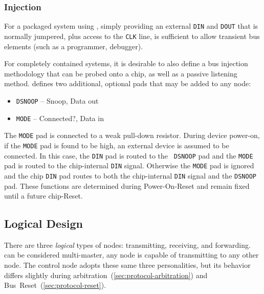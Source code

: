 \subsubsection{Injection}
For a packaged system using \bus, simply providing an external {\tt DIN} and
{\tt DOUT} that is normally jumpered, plus access to the {\tt CLK} line, is
sufficient to allow transient bus elements (such as a programmer, debugger).

For completely contained systems, it is desirable to also define a bus
injection methodology that can be probed onto a chip, as well as a passive
listening method. \bus defines two additional, optional pads that may be added
to any node:

\begin{itemize}
  \item {\tt DSNOOP} -- Snoop, Data out
  \item {\tt MODE}   -- Connected?, Data in
\end{itemize}

The {\tt MODE} pad is connected to a weak pull-down resistor. During device
power-on, if the {\tt MODE} pad is found to be high, an external device is
assumed to be connected. In this case, the {\tt DIN} pad is routed to the {\tt
DSNOOP} pad and the {\tt MODE} pad is routed to the chip-internal {\tt DIN}
signal. Otherwise the {\tt MODE} pad is ignored and the chip {\tt DIN} pad
routes to both the chip-internal {\tt DIN} signal and the {\tt DSNOOP} pad.
These functions are determined during Power-On-Reset and remain fixed until a
future chip-Reset.


\subsection{Logical Design}
\label{sec:logical}

There are three {\em logical} types of \bus nodes: transmitting, receiving,
and forwarding. \bus can be considered multi-master, any node is capable of
transmitting to any other node. The control node adopts these same three
personalities, but its behavior differs slightly during
arbitration~(\ref{sec:protocol-arbitration}) and
Bus~Reset~(\ref{sec:protocol-reset}).

